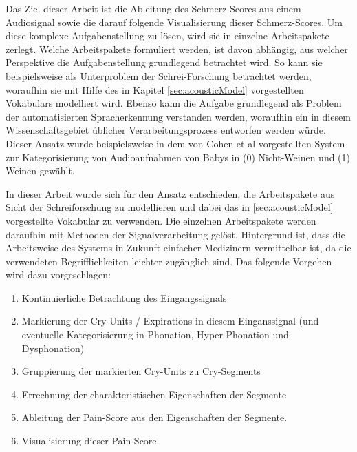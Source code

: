Das Ziel dieser Arbeit ist die Ableitung des Schmerz-Scores aus einem Audiosignal sowie die darauf folgende Visualisierung dieser Schmerz-Scores. Um diese komplexe Aufgabenstellung zu lösen, wird sie in einzelne Arbeitspakete zerlegt. Welche Arbeitspakete formuliert werden, ist davon abhängig, aus welcher Perspektive die Aufgabenstellung grundlegend betrachtet wird. So kann sie beispielsweise als Unterproblem der Schrei-Forschung betrachtet werden, woraufhin sie mit Hilfe des in Kapitel \ref{sec:acousticModel} vorgestellten Vokabulars modelliert wird. Ebenso kann die Aufgabe grundlegend als Problem der automatisierten Spracherkennung verstanden werden, woraufhin ein in diesem Wissenschaftsgebiet üblicher Verarbeitungsprozess entworfen werden würde. Dieser Ansatz wurde beispielsweise in dem von Cohen et al vorgestellten System zur Kategorisierung von Audioaufnahmen von Babys in (0) Nicht-Weinen und (1) Weinen gewählt.\cite{automaticCryDetection} 

In dieser Arbeit wurde sich für den Ansatz entschieden, die Arbeitspakete aus Sicht der Schreiforschung zu modellieren und dabei das in \ref{sec:acousticModel} vorgestellte Vokabular zu verwenden. Die einzelnen Arbeitspakete werden daraufhin mit Methoden der Signalverarbeitung gelöst. Hintergrund ist, dass die Arbeitsweise des Systems in Zukunft einfacher Medizinern vermittelbar ist, da die verwendeten Begrifflichkeiten leichter zugänglich sind. Das folgende Vorgehen wird dazu vorgeschlagen:

\begin{enumerate}[leftmargin=*]
	\item Kontinuierliche Betrachtung des Eingangssignals
	\item Markierung der Cry-Units / Expirations in diesem Einganssignal (und eventuelle Kategorisierung in Phonation, Hyper-Phonation und Dysphonation)
	\item Gruppierung der markierten Cry-Units zu Cry-Segments
	\item Errechnung der charakteristischen Eigenschaften der Segmente
	\item Ableitung der Pain-Score aus den Eigenschaften der Segmente.
	\item Visualisierung dieser Pain-Score.
\end{enumerate}

